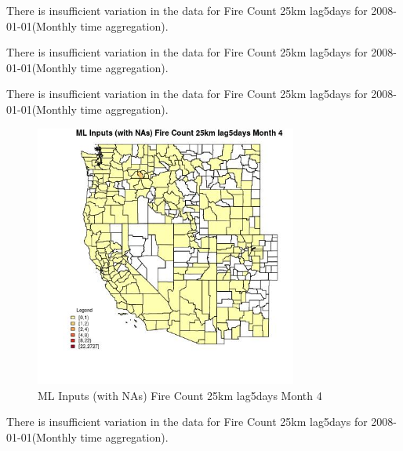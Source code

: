 There is insufficient variation in the data for Fire Count 25km lag5days for 2008-01-01(Monthly time aggregation). 
 

There is insufficient variation in the data for Fire Count 25km lag5days for 2008-01-01(Monthly time aggregation). 
 

There is insufficient variation in the data for Fire Count 25km lag5days for 2008-01-01(Monthly time aggregation). 
 

\begin{figure} 
\centering  
\includegraphics[width=0.77\textwidth]{Code_Outputs/Report_ML_input_PM25_Step4_part_f_de_duplicated_aveswNAs_CountyFire_Count_25km_lag5daysmedianMonth4.jpg} 
\caption{\label{fig:Report_ML_input_PM25_Step4_part_f_de_duplicated_aveswNAsCountyFire_Count_25km_lag5daysmedianMonth4}ML Inputs (with NAs) Fire Count 25km lag5days Month 4} 
\end{figure} 
 

There is insufficient variation in the data for Fire Count 25km lag5days for 2008-01-01(Monthly time aggregation). 
 

